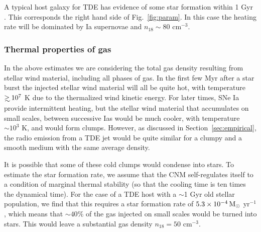 \documentclass[usenatbib,fleqn]{mnras}
\newcommand\gsim{\mathrel{\rlap{\lower4pt\hbox{\hskip1pt$\sim$}}
    \raise1pt\hbox{$>$}}}
\newcommand{\Msun}{{\rm M_\odot}}
\begin{document}
A typical host galaxy for TDE has evidence of some star formation
within 1 Gyr \citep{French+2016}. This corresponds the right hand side
of Fig.~\ref{fig:param}. In this case the heating rate will be
dominated by Ia supernovae and $n_{18}\sim 80$ cm$^{-3}$.

\subsubsection{Thermal properties of gas}

In the above estimates we are considering the total gas density
resulting from stellar wind material, including all phases of gas. In
the first few Myr after a star burst the injected stellar wind
material will all be quite hot, with temperature $\gsim 10^{7}$ K due
to the thermalized wind kinetic energy. For later times, SNe Ia
provide intermittent heating, but the stellar wind material that
accumulates on small scales, between successive Ias would be much
cooler, with temperature $\sim 10^{3}$ K, and would form
clumps. However, as discussed in Section~\ref{sec:empirical}, the
radio emission from a TDE jet would be quite similar for a clumpy and
a smooth medium with the same average density.



It is possible that some of these cold clumps would condense into
stars. To estimate the star formation rate, we assume that the CNM
self-regulates itself to a condition of marginal thermal stability (so
that the cooling time is ten times the dynamical time). For the case
of a TDE host with a $\sim$1 Gyr old stellar population, we find that
this requires a star formation rate of  $5.3 \times 10^{-4}
\,\Msun$ yr$^{-1}$, which means that $\sim 40$\% of the gas injected
on small scales would be turned into stars. This would leave a
substantial gas density $n_{18}=50$ cm$^{-3}$.
\end{document}
